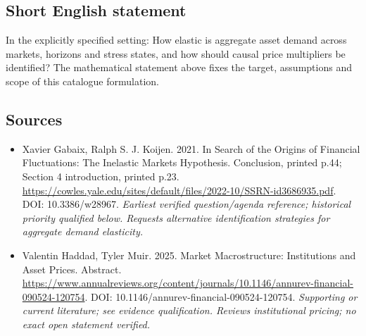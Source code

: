 \documentclass[11pt]{article}
\begin{document}
\subsection{Short English statement}
In the explicitly specified setting: How elastic is aggregate asset demand across markets, horizons and stress states, and how should causal price multipliers be identified? The mathematical statement above fixes the target, assumptions and scope of this catalogue formulation.

\subsection{Sources}
\begin{itemize}\raggedright
\item[\textnormal{[S1]}]\hypertarget{source:30007594:1}{} Xavier Gabaix, Ralph S. J. Koijen. 2021. In Search of the Origins of Financial Fluctuations: The Inelastic Markets Hypothesis. Conclusion, printed p.44; Section 4 introduction, printed p.23.
\url{https://cowles.yale.edu/sites/default/files/2022-10/SSRN-id3686935.pdf}.
DOI: 10.3386/w28967.
{\small\textit{Earliest verified question/agenda reference; historical priority qualified below. Requests alternative identification strategies for aggregate demand elasticity.}}

\item[\textnormal{[S2]}]\hypertarget{source:30007594:2}{} Valentin Haddad, Tyler Muir. 2025. Market Macrostructure: Institutions and Asset Prices. Abstract.
\url{https://www.annualreviews.org/content/journals/10.1146/annurev-financial-090524-120754}.
DOI: 10.1146/annurev-financial-090524-120754.
{\small\textit{Supporting or current literature; see evidence qualification. Reviews institutional pricing; no exact open statement verified.}}
\end{itemize}
\end{document}

